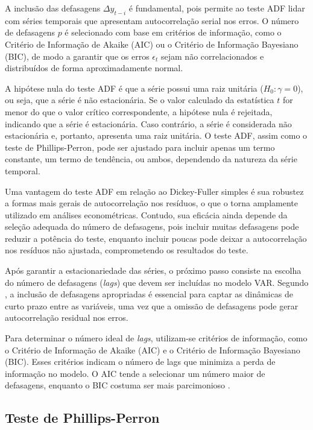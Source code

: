 \documentclass[12pt,oneside,a4paper,chapter=TITLE,english,brazil,sumario=abnt-6027-2012]{abntex2}
\begin{document}
A inclusão das defasagens \( \Delta y_{t-i} \) é fundamental, pois permite ao teste ADF lidar com séries temporais que apresentam autocorrelação serial nos erros. O número de defasagens \( p \) é selecionado com base em critérios de informação, como o Critério de Informação de Akaike (AIC) ou o Critério de Informação Bayesiano (BIC), de modo a garantir que os erros \( \epsilon_t \) sejam não correlacionados e distribuídos de forma aproximadamente normal.

A hipótese nula do teste ADF é que a série possui uma raiz unitária (\( H_0: \gamma = 0 \)), ou seja, que a série é não estacionária. Se o valor calculado da estatística \( t \) for menor do que o valor crítico correspondente, a hipótese nula é rejeitada, indicando que a série é estacionária. Caso contrário, a série é considerada não estacionária e, portanto, apresenta uma raiz unitária. O teste ADF, assim como o teste de Phillips-Perron, pode ser ajustado para incluir apenas um termo constante, um termo de tendência, ou ambos, dependendo da natureza da série temporal.

Uma vantagem do teste ADF em relação ao Dickey-Fuller simples é sua robustez a formas mais gerais de autocorrelação nos resíduos, o que o torna amplamente utilizado em análises econométricas. Contudo, sua eficácia ainda depende da seleção adequada do número de defasagens, pois incluir muitas defasagens pode reduzir a potência do teste, enquanto incluir poucas pode deixar a autocorrelação nos resíduos não ajustada, comprometendo os resultados do teste.


Após garantir a estacionariedade das séries, o próximo passo consiste na escolha do número de defasagens (\textit{lags}) que devem ser incluídas no modelo VAR. Segundo , a inclusão de defasagens apropriadas é essencial para captar as dinâmicas de curto prazo entre as variáveis, uma vez que a omissão de defasagens pode gerar autocorrelação residual nos erros. 

Para determinar o número ideal de \textit{lags}, utilizam-se critérios de informação, como o Critério de Informação de Akaike (AIC) e o Critério de Informação Bayesiano (BIC). Esses critérios indicam o número de lags que minimiza a perda de informação no modelo. O AIC tende a selecionar um número maior de defasagens, enquanto o BIC costuma ser mais parcimonioso \cite{enders_2014_applied_econometric}.

\subsection{Teste de Phillips-Perron}
\end{document}
